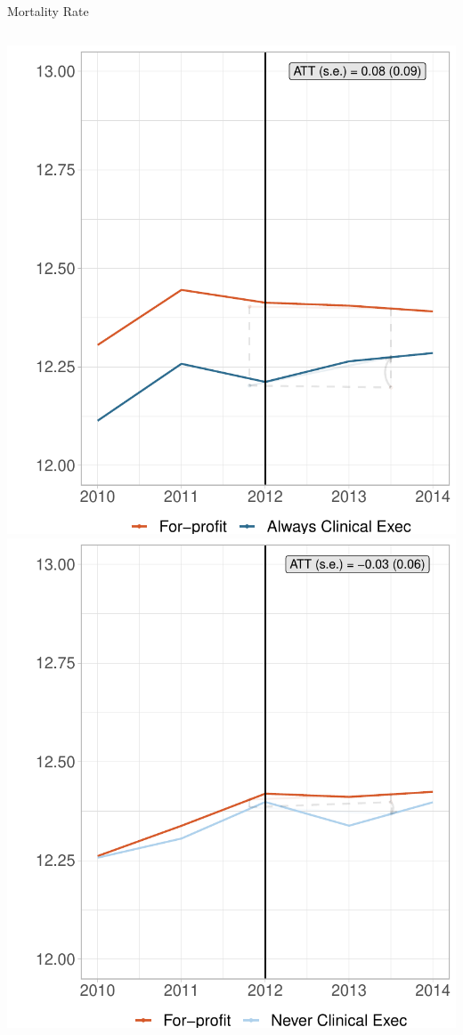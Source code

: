 \documentclass[notes,11pt, aspectratio=169]{beamer}
\begin{document}
\begin{frame}{Mortality Rate}
    \begin{columns}
        \centering
        \includegraphics[width=.9\textwidth]{Objects/fp_mort_md_synth_graph.pdf}
        \centering
        \includegraphics[width=.9\textwidth]{Objects/fp_mort_nomd_synth_graph.pdf}
    \end{columns}
\end{frame}
\end{document}
